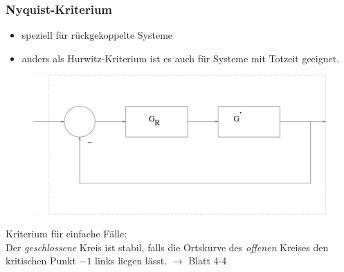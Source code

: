 \documentclass[12pt,a4paper,ngerman]{scrartcl}
\begin{document}
\subsubsection{Nyquist-Kriterium}

\begin{itemize}
\item speziell für rückgekoppelte Systeme
\item anders als Hurwitz-Kriterium ist es auch für Systeme mit Totzeit geeignet.
\end{itemize}

\begin{figure}[H]
\includegraphics[width=0.7\linewidth]{sysregel_nyquist}
\end{figure}
Kriterium für einfache Fälle:\\
Der \emph{geschlossene} Kreis ist stabil, falls die Ortskurve des \emph{offenen} Kreises den kritischen Punkt $-1$ links liegen lässt. $\rightarrow$ Blatt 4-4
\end{document}
